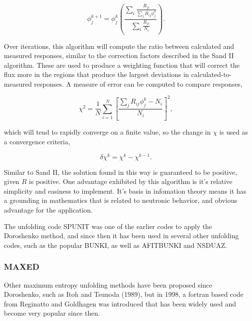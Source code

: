 \begin{equation}\label{eqn:doroshenko}
\phi_j^{k + 1} = \phi_j^{k} (\frac{\sum_i \frac{R_{ji}}{\sum_j R_{ij} \phi_j^k}}{\sum_i \frac{R_{ji}}{N_i}}) .
\end{equation}

Over iterations, this algorithm will compute the ratio between calculated and measured responses, similar to the correction factors described in the Sand II algorithm.
These are used to produce a weighting function that will correct the flux more in the regions that produce the largest deviations in calculated-to-measured responses.
A measure of error can be computed to compare responses,

\begin{equation}\label{eqn:doroshenko-error}
\chi^2 = \frac{1}{N} \sum_{i=1}^N [\frac{\sum_j R_{ij} \phi_j^k - N_i}{N_i}]^2 ,
\end{equation}

which will tend to rapidly converge on a finite value, so the change in $\chi$ is used as a convergence criteria,

\begin{equation}\label{eqn:doroshenko-error-delta}
\delta \chi^k = \chi^k - \chi^{k-1} .
\end{equation}

Similar to Sand II, the solution found in this way is guaranteed to be positive, given $R$ is positive.
One advantage exhibited by this algorithm is it's relative simplicity and easiness to implement.
It's basis in infomation theory means it has a grounding in mathematics that is related to neutronic behavior, and obvious advantage for the application.

The unfolding code SPUNIT was one of the earlier codes to apply the Doroshenko method, and since then it has been used in several other unfolding codes, such as the popular BUNKI, as well as AFITBUNKI and NSDUAZ.




\subsubsection{MAXED}

Other maximum entropy unfolding methods have been proposed since Doroshenko, such as Itoh and Tsunoda (1989), but in 1998, a fortran based code from Reginatto and Goldhagen was introduced that has been widely used and become very popular since then.

